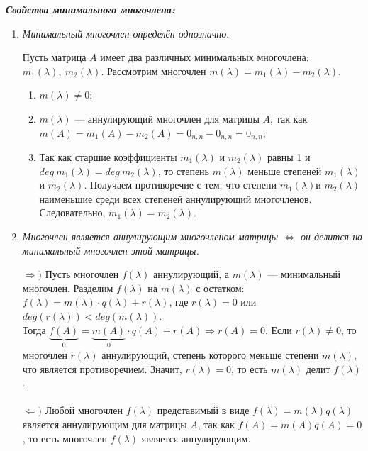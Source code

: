 \textit{\textbf{Свойства минимального многочлена:}}\begin{enumerate}
	\item \textit{Минимальный многочлен определён однозначно}.\begin{Proof}
		Пусть матрица $A$ имеет два различных минимальных многочлена: $m_1(\lambda),\ m_2(\lambda)$. Рассмотрим многочлен $m(\lambda) = m_1(\lambda) - m_2(\lambda)$.\begin{enumerate}
			\item $m(\lambda) \ne 0$;
			\item $m(\lambda)$ --- аннулирующий многочлен для матрицы $A$, так как $m(A) = m_1(A) - m_2(A) = 0_{n,n} - 0_{n,n} = 0_{n,n}$;
			\item Так как старшие коэффициенты $m_1(\lambda)$ и $m_2(\lambda)$ равны 1 и $deg\ m_1(\lambda) = deg\ m_2(\lambda)$, то степень $m(\lambda)$ меньше степеней $m_1(\lambda)$и $m_2(\lambda)$. Получаем противоречие с тем, что степени $m_1(\lambda)$и $m_2(\lambda)$ наименьшие среди всех степеней аннулирующий многочленов. Следовательно, $m_1(\lambda)=m_2(\lambda)$.
		\end{enumerate} 
	\end{Proof}
	\item \textit{Многочлен является аннулирующим многочленом матрицы $\Longleftrightarrow$ он
		делится на минимальный многочлен этой матрицы.}\begin{Proof}
		$\Rightarrow)$ Пусть многочлен $f(\lambda) $ аннулирующий, а $m(\lambda)$ --- минимальный многочлен. Разделим $f(\lambda)$ на $m(\lambda)$ с остатком:\\
		$f(\lambda) = m(\lambda) \cdot q(\lambda) + r(\lambda)$, где $r(\lambda) = 0$ или $deg (r(\lambda)) < deg (m(\lambda))$.\\
		Тогда $\underbrace{f(A)}_{0} = \underbrace{m(A)}_{0} \cdot q(A) + r(A) \Rightarrow r(A) = 0$. Если $r(\lambda) \ne 0$, то многочлен $r(\lambda)$ аннулирующий, степень которого меньше степени $m(\lambda)$, что является противоречием. Значит, $r(\lambda) = 0$, то есть $m(\lambda)$ делит $f(\lambda)$.\\\\
		$\Leftarrow)$ Любой многочлен $f(\lambda)$ представимый в виде $f(\lambda)=m(\lambda)q(\lambda)$ является аннулирующим для матрицы $A$, так как $f(A) = m(A)q(A) = 0$, то есть многочлен $f(\lambda)$ является аннулирующим.
	\end{Proof}
\end{enumerate}
